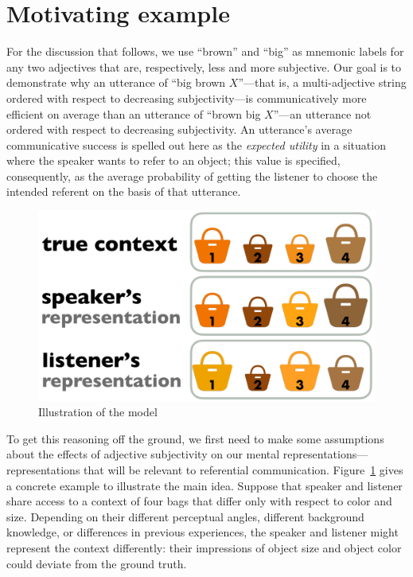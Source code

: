 \documentclass[10pt,a4paper]{article}
\begin{document}
\section{Motivating example}

For the discussion that follows, we use ``brown'' and ``big'' as mnemonic labels for any two adjectives that are, respectively, less and more subjective. Our goal is to demonstrate why an utterance of ``big brown $X$''---that is, a multi-adjective string ordered with respect to decreasing subjectivity---is communicatively more efficient on average than an utterance of ``brown big $X$''---an utterance not ordered with respect to decreasing subjectivity. An utterance's average communicative success is spelled out here as the \emph{expected utility} in a situation where the speaker wants to refer to an object; this value is specified, consequently, as the average probability of getting the listener to choose the intended referent on the basis of that utterance.

\begin{figure}[t]
  \centering
 \includegraphics[width=\linewidth]{model_picture.pdf} 
  \caption{Illustration of the model}
  \label{fig:ModelIllustration}
\end{figure}

To get this reasoning off the ground, we first need to make some assumptions about the effects of adjective subjectivity on our mental representations---representations that will be relevant to referential communication. Figure~\ref{fig:ModelIllustration} gives a concrete example to illustrate the main idea. Suppose that speaker and listener share access to a context of four bags that differ only with respect to color and size. Depending on their different perceptual angles, different background knowledge, or differences in previous experiences, the speaker and listener might represent the context differently: their impressions of object size and object color could deviate from the ground truth. 
\end{document}
